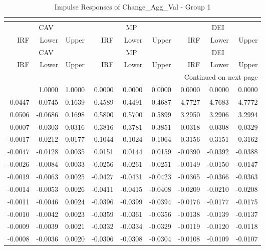 \begin{longtable}{rrrrrrrrr}
\caption{Impulse Responses of Change_Agg_Val - Group 1}\\
\label{tab:cav_irf_group1}\\
\toprule
\multicolumn{3}{c}{CAV} & \multicolumn{3}{c}{MP} & \multicolumn{3}{c}{DEI} \\
IRF & Lower & Upper & IRF & Lower & Upper & IRF & Lower & Upper \\
\midrule
\endfirsthead
\toprule
\multicolumn{3}{c}{CAV} & \multicolumn{3}{c}{MP} & \multicolumn{3}{c}{DEI} \\
IRF & Lower & Upper & IRF & Lower & Upper & IRF & Lower & Upper \\
\midrule
\endhead
\midrule
\multicolumn{9}{r}{Continued on next page} \\
\midrule
\endfoot
\bottomrule
\endlastfoot
1.0000 & 1.0000 & 1.0000 & 0.0000 & 0.0000 & 0.0000 & 0.0000 & 0.0000 & 0.0000 \\
0.0447 & -0.0745 & 0.1639 & 0.4589 & 0.4491 & 0.4687 & 4.7727 & 4.7683 & 4.7772 \\
0.0506 & -0.0686 & 0.1698 & 0.5800 & 0.5700 & 0.5899 & 3.2950 & 3.2906 & 3.2994 \\
0.0007 & -0.0303 & 0.0316 & 0.3816 & 0.3781 & 0.3851 & 0.0318 & 0.0308 & 0.0329 \\
-0.0017 & -0.0212 & 0.0177 & 0.1044 & 0.1024 & 0.1064 & 0.3156 & 0.3151 & 0.3162 \\
-0.0047 & -0.0128 & 0.0035 & 0.0151 & 0.0144 & 0.0159 & -0.0390 & -0.0392 & -0.0388 \\
-0.0026 & -0.0084 & 0.0033 & -0.0256 & -0.0261 & -0.0251 & -0.0149 & -0.0150 & -0.0147 \\
-0.0019 & -0.0063 & 0.0025 & -0.0427 & -0.0431 & -0.0423 & -0.0365 & -0.0366 & -0.0363 \\
-0.0014 & -0.0053 & 0.0026 & -0.0411 & -0.0415 & -0.0408 & -0.0209 & -0.0210 & -0.0208 \\
-0.0011 & -0.0046 & 0.0024 & -0.0396 & -0.0399 & -0.0394 & -0.0176 & -0.0177 & -0.0175 \\
-0.0010 & -0.0042 & 0.0023 & -0.0359 & -0.0361 & -0.0356 & -0.0138 & -0.0139 & -0.0137 \\
-0.0009 & -0.0039 & 0.0021 & -0.0332 & -0.0334 & -0.0329 & -0.0119 & -0.0120 & -0.0118 \\
-0.0008 & -0.0036 & 0.0020 & -0.0306 & -0.0308 & -0.0304 & -0.0108 & -0.0109 & -0.0107 \\
\end{longtable}